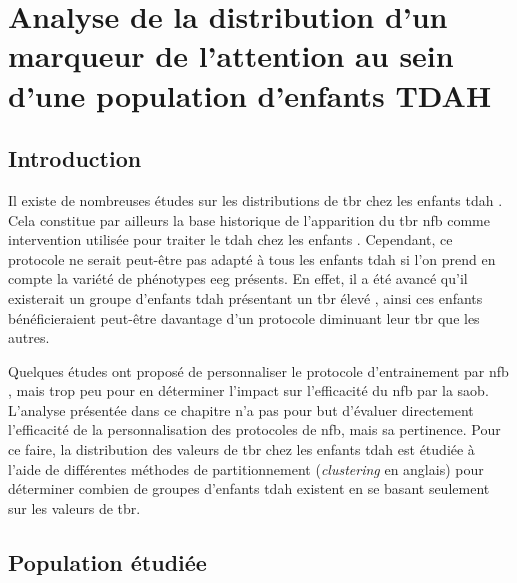 \chapter{Analyse de la distribution d'un marqueur de l'attention au sein d'une population d'enfants TDAH} \label{chapitre-4}

\section*{Introduction}
Il existe de nombreuses études sur les distributions de \gls{tbr} chez les enfants \gls{tdah}
\citep{Arns2013, Clarke2001, Zhang2017}. Cela constitue par ailleurs la base historique de l'apparition du \gls{tbr} \gls{nfb} comme intervention utilisée
pour traiter le \gls{tdah} chez les enfants \citep{Arnold2014, Deilami2016, Gevensleben2009, VanDongen2013}. Cependant, ce protocole ne serait 
peut-être pas adapté à tous les enfants \gls{tdah} si 
l'on prend en compte la variété de phénotypes \gls{eeg} présents. En effet, il a été avancé qu'il existerait un groupe d'enfants \gls{tdah} présentant un \gls{tbr} élevé 
\citep{Zhang2017, Clarke2011}, ainsi ces enfants bénéficieraient peut-être davantage d'un protocole diminuant leur \gls{tbr} que les autres. 

Quelques études ont proposé de personnaliser le protocole d'entrainement par \gls{nfb} \citep{Bazanova2018, Escolano2014}, mais trop peu pour en déterminer
l'impact sur l'efficacité du \gls{nfb} par la \gls{saob}. L'analyse présentée dans ce chapitre n'a pas pour but d'évaluer directement l'efficacité de la 
personnalisation des protocoles de \gls{nfb}, mais sa pertinence. Pour ce faire, la distribution des valeurs de \gls{tbr} chez les enfants \gls{tdah} est 
étudiée à l'aide de différentes méthodes de partitionnement (\textit{clustering} en anglais) pour déterminer combien de groupes d'enfants \gls{tdah} existent en se basant seulement sur les 
valeurs de \gls{tbr}. 
\clearpage

\section{Population étudiée}

